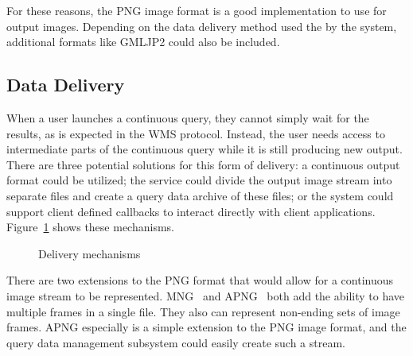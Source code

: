 \documentclass{ucdthesis}       %
\begin{document}
For these reasons, the \ac{PNG} image format is a good implementation
to use for output images.  Depending on the data delivery method used
the by the system, additional formats like \ac{GMLJP2} could also be
included.

\subsection{Data Delivery}
\label{sec:on-delivery}


When a user launches a continuous query, they cannot simply wait for
the results, as is expected in the \ac{WMS} protocol.  Instead, the
user needs access to intermediate parts of the continuous query while
it is still producing new output.  There are three potential solutions
for this form of delivery: a continuous output format could be
utilized; the service could divide the output image stream into
separate files and create a query data archive of these files; or the
system could support client defined callbacks to interact directly
with client applications.  Figure~\ref{fig:delivery} shows these
mechanisms.

\begin{figure}[htb]
  \centering
  \subfigure[Continuous]{
    
  }\hfill
  \subfigure[Archive]{
    
  }\hfill
  \subfigure[Callback]{
    
  }
  \caption{Delivery mechanisms}
  \label{fig:delivery}
\end{figure}

There are two extensions to the \ac{PNG} format that would allow for a
continuous image stream to be represented.  \ac{MNG}~\cite{wiki06} and
\ac{APNG}~\cite{wiki06} both add the ability to have multiple frames
in a single file.  They also can represent non-ending sets of image
frames.  \ac{APNG} especially is a simple extension to the \ac{PNG}
image format, and the query data management subsystem could easily
create such a stream.
\end{document}
